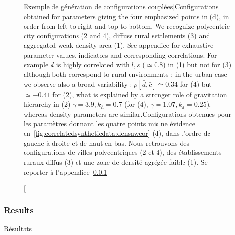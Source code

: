 \begin{figure}
\caption[Examples of generated coupled configurations][Exemple de génération de configurations couplées]{Configurations obtained for parameters giving the four emphasized points in (d), in order from left to right and top to bottom. We recognize polycentric city configurations (2 and 4), diffuse rural settlements (3) and aggregated weak density area (1). See appendice for exhaustive parameter values, indicators and corresponding correlations. For example $\bar{d}$ is highly correlated with $\bar{l},\bar{s}$ ($\simeq$0.8) in (1) but not for (3) although both correspond to rural environments ; in the urban case we observe also a broad variability : $\rho[\bar{d},\bar{c}]\simeq 0.34$ for (4) but $\simeq-0.41$ for (2), what is explained by a stronger role of gravitation hierarchy in (2) $\gamma=3.9,k_h=0.7$ (for (4), $\gamma=1.07,k_h=0.25$), whereas density parameters are similar.}{Configurations obtenues pour les paramètres donnant les quatre points mis ne évidence en~\ref{fig:correlatedsyntheticdata:densnwcor} (d), dans l'ordre de gauche à droite et de haut en bas. Nous retrouvons des configurations de villes polycentriques (2 et 4), des établissements ruraux diffus (3) et une zone de densité agrégée faible (1). Se reporter à l'appendice~\ref{}}{}
\end{figure}





\subsubsection{Results}{Résultats}


